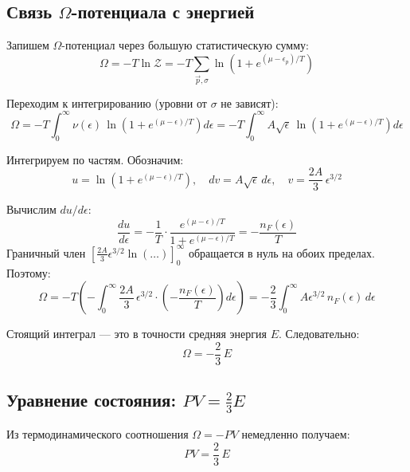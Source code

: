 \documentclass[../general/general]{subfiles}
\begin{document}
\subsection{Связь $\Omega$-потенциала с энергией}

Запишем $\Omega$-потенциал через большую статистическую сумму:
\begin{equation}
    \Omega = -T\ln\mathcal{Z} = -T\sum_{\vec{p},\sigma} \ln\!\left(1 + e^{(\mu - \epsilon_p)/T}\right)
\end{equation}

Переходим к интегрированию (уровни от $\sigma$ не зависят):
\begin{equation}
    \Omega = -T\int_0^\infty \nu(\epsilon)\,\ln\!\left(1 + e^{(\mu-\epsilon)/T}\right) d\epsilon = -T\!\int_0^\infty A\sqrt{\epsilon}\,\ln\!\left(1 + e^{(\mu-\epsilon)/T}\right) d\epsilon
\end{equation}

Интегрируем по частям. Обозначим:
\begin{equation}
    u = \ln\!\left(1 + e^{(\mu-\epsilon)/T}\right),
    \quad dv = A\sqrt{\epsilon}\, d\epsilon, \quad v = \frac{2A}{3}\,\epsilon^{3/2}
\end{equation}

Вычислим $du/d\epsilon$:
\begin{equation}
    \frac{du}{d\epsilon} = -\frac{1}{T}\cdot\frac{e^{(\mu-\epsilon)/T}}{1+e^{(\mu-\epsilon)/T}} = -\frac{n_F(\epsilon)}{T}
\end{equation}
Граничный член $\left[\frac{2A}{3}\epsilon^{3/2}\ln(\ldots)\right]_0^\infty$ обращается в нуль на обоих пределах. Поэтому:
\begin{equation}
    \Omega = -T\!\left(-\int_0^\infty \frac{2A}{3}\,\epsilon^{3/2}\cdot\!\left(-\frac{n_F(\epsilon)}{T}\right) d\epsilon\right) = -\frac{2}{3}\int_0^\infty A\epsilon^{3/2}\,n_F(\epsilon)\, d\epsilon
\end{equation}

Стоящий интеграл --- это в точности средняя энергия $E$. Следовательно:
\begin{equation}
    \Omega = -\frac{2}{3}\,E
    \label{eq:Omega_E}
\end{equation}

\subsection{Уравнение состояния: $PV = \frac{2}{3}E$}

Из термодинамического соотношения $\Omega = -PV$ немедленно получаем:
\begin{equation}
    \boxed{PV = \frac{2}{3}\,E}
    \label{eq:PV_E}
\end{equation}
\end{document}
